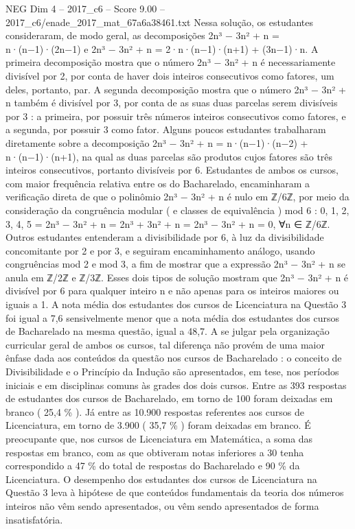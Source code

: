 \begin{textsample}{NEG Dim 4 – 2017\_c6 – Score 9.00 – 2017\_c6/enade\_2017\_mat\_67a6a38461.txt}
Nessa solução, os estudantes consideraram, de modo geral, as decomposições 2n³ − 3n² + n = n·(n−1)·(2n−1) e 2n³ − 3n² + n = 2·n·(n−1)·(n+1) + (3n−1)·n.
A primeira decomposição mostra que o número 2n³ − 3n² + n é necessariamente divisível por 2, por conta de haver dois inteiros consecutivos como fatores, um deles, portanto, par.
A segunda decomposição mostra que o número 2n³ − 3n² + n também é divisível por 3, por conta de as suas duas parcelas serem divisíveis por 3 : a primeira, por possuir três números inteiros consecutivos como fatores, e a segunda, por possuir 3 como fator.
Alguns poucos estudantes trabalharam diretamente sobre a decomposição 2n³ − 3n² + n = n·(n−1)·(n−2) + n·(n−1)·(n+1), na qual as duas parcelas são produtos cujos fatores são três inteiros consecutivos, portanto divisíveis por 6.
Estudantes de ambos os cursos, com maior frequência relativa entre os do Bacharelado, encaminharam a verificação direta de que o polinômio 2n³ − 3n² + n é nulo em ℤ/6ℤ, por meio da consideração da congruência modular ( e classes de equivalência ) mod 6 : 0, 1, 2, 3, 4, 5 = 2n³ − 3n² + n = 2n³ + 3n² + n = 2n³ − 3n² + n = 0, ∀n ∈ ℤ/6ℤ.
Outros estudantes entenderam a divisibilidade por 6, à luz da divisibilidade concomitante por 2 e por 3, e seguiram encaminhamento análogo, usando congruências mod 2 e mod 3, a fim de mostrar que a expressão 2n³ − 3n² + n se anula em ℤ/2ℤ e ℤ/3ℤ.
Esses dois tipos de solução mostram que 2n³ − 3n² + n é divisível por 6 para qualquer inteiro n e não apenas para os inteiros maiores ou iguais a 1.
A nota média dos estudantes dos cursos de Licenciatura na Questão 3 foi igual a 7,6 sensivelmente menor que a nota média dos estudantes dos cursos de Bacharelado na mesma questão, igual a 48,7.
A se julgar pela organização curricular geral de ambos os cursos, tal diferença não provém de uma maior ênfase dada aos conteúdos da questão nos cursos de Bacharelado : o conceito de Divisibilidade e o Princípio da Indução são apresentados, em tese, nos períodos iniciais e em disciplinas comuns às grades dos dois cursos.
Entre as 393 respostas de estudantes dos cursos de Bacharelado, em torno de 100 foram deixadas em branco ( 25,4 \% ).
Já entre as 10.900 respostas referentes aos cursos de Licenciatura, em torno de 3.900 ( 35,7 \% ) foram deixadas em branco.
É preocupante que, nos cursos de Licenciatura em Matemática, a soma das respostas em branco, com as que obtiveram notas inferiores a 30 tenha correspondido a 47 \% do total de respostas do Bacharelado e 90 \% da Licenciatura.
O desempenho dos estudantes dos cursos de Licenciatura na Questão 3 leva à hipótese de que conteúdos fundamentais da teoria dos números inteiros não vêm sendo apresentados, ou vêm sendo apresentados de forma insatisfatória.

\end{textsample}
